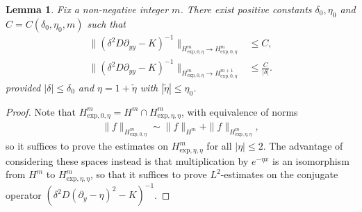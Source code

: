 \documentclass[11pt]{article}
\newtheorem{lemma}[prop]{Lemma}
\numberwithin{equation}{section}
\numberwithin{prop}{section}
\begin{document}
\begin{lemma}\label{l: preconditioner regularity}
	Fix a non-negative integer $m$. There exist positive constants $\delta_0, \eta_0$ and $C = C(\delta_0, \eta_0, m)$ such that 
	\begin{align}
		\| (\delta^2 D \partial_{yy} - K)^{-1} \|_{H^m_{\mathrm{exp}, 0, \eta} \to H^m_{\mathrm{exp}, 0, \eta}} &\leq C, \label{e: preconditioner weighted 1} \\
		\| (\delta^2 D \partial_{yy} - K)^{-1} \|_{H^m_{\mathrm{exp}, 0, \eta} \to H^{m+1}_{\mathrm{exp}, 0, \eta}} &\leq \frac{C}{|\delta|}. \label{e: preconditioner weighted 2} 
	\end{align}
	provided $|\delta| \leq \delta_0$ and $\eta = 1 + \tilde{\eta}$ with $|\tilde{\eta}| \leq \eta_0$. 
\end{lemma}
\begin{proof}
	Note that $H^m_{\mathrm{exp}, 0, \eta} = H^m \cap H^m_{\mathrm{exp}, \eta, \eta}$, with equivalence of norms
	\begin{align*}
		\| f \|_{H^m_{\mathrm{exp}, 0, \eta}} \sim \| f \|_{H^m} + \| f \|_{H^m_{\mathrm{exp}, \eta, \eta}},
	\end{align*}
	so it suffices to prove the estimates on $H^m_{\mathrm{exp}, \eta, \eta}$ for all $|\eta| \leq 2$. The advantage of considering these spaces instead is that multiplication by $e^{-\eta x}$ is an isomorphism from $H^m$ to $H^m_{\mathrm{exp}, \eta, \eta}$, so that it suffices to prove $L^2$-estimates on the conjugate operator $(\delta^2 D (\partial_y - \eta)^2 - K)^{-1}$. 
	

\end{proof}
\end{document}
